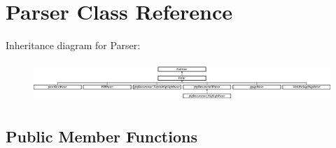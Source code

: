 \hypertarget{class_parser}{\section{\-Parser \-Class \-Reference}
\label{class_parser}
}
\-Inheritance diagram for \-Parser\-:\begin{figure}[H]
\begin{center}
\leavevmode
\includegraphics[height=1.523810cm]{class_parser}
\end{center}
\end{figure}
\subsection*{\-Public \-Member \-Functions}
